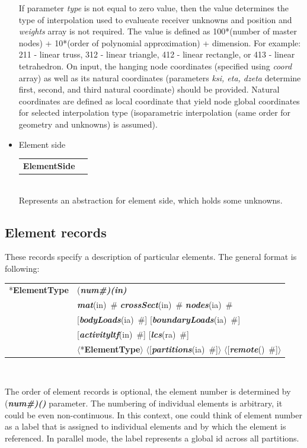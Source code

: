 \documentclass[a4paper]{article}
\makeatletter
\newcommand{\param}[1]{{\em #1}}
\newcommand{\fieldVal}[2]{\mbox{({\it\bf{#1}\#)\tiny (#2)}}}
\newcommand{\keywordnotype}[1]{\mbox{{\it{\bf{#1}}}}}
\newcommand{\keyword}[2]{\mbox{{\keywordnotype{#1}\tiny (#2)}}}
\newcommand{\entKeyword}[1]{\mbox{{*{\bf{#1}}}}}
\newcommand{\entKeywordInst}[1]{\mbox{{\bf{{#1}}}}}
\newcommand{\field}[2]{\mbox{\keyword{#1}{#2}~\#}}
\newcommand{\optField}[2]{\mbox{[\field{#1}{#2}]}}
\newcommand{\Pmode}[1]{{\sffamily #1}}
\newcommand{\PentKeyword}[1]{\mbox{{$\langle$*{\bf{#1}}$\rangle$}}}
\newcommand{\PoptField}[2]{\mbox{$\langle$[\field{#1}{#2}]$\rangle$}}
\newenvironment{record}[1][]{\begin{tabular}{|ll}}{\end{tabular}\\}
\newcommand{\recentry}[2]{{#1}&{#2}\\}
\newcounter{rcc}
\newenvironment{record}[1][\textwidth]{\setcounter{rcc}{0}\begin{tabular*}{#1}{|ll@{\extracolsep{\fill}}r}}{\end{tabular*}\\}
\newcommand{\recentry}[2]{\ifthenelse{\value{rcc}>0}{&$\backslash$ \\}{\setcounter{rcc}{1}}{#1}&{#2}}
\makeatother
\begin{document}
\begin{itemize}
If parameter \param{type} is not equal to zero value, then the value determines the type of interpolation used to
evalueate receiver unknowns and position and \param{weights} array is not required. The value is
defined as 100*(number of master nodes) + 10*(order of polynomial
approximation) + dimension. For example: 211 - linear truss, 312 -
linear triangle, 412 - linear rectangle, or 413 - linear tetrahedron.
On input, the hanging node coordinates (specified using
\param{coord} array) as well as its natural coordinates (parameters
\param{ksi, eta, dzeta} determine first, second, and third natural
coordinate) should be provided.  Natural coordinates are
defined as local coordinate that yield node global coordinates for
selected interpolation type (isoparametric interpolation (same order
for geometry and unknowns) is assumed).




\item Element side

  \begin{record}[0.9\textwidth]
    \recentry{\entKeywordInst{ElementSide}}{}
  \end{record}
  Represents an abstraction for element side, which holds some unknowns.
\end{itemize}

\subsection{Element records}
\label{_ElementsRecords}
These records specify a description of particular elements. The
general format is following:

\noindent
\begin{record}
  \recentry{\entKeyword{ElementType}}{\fieldVal{num}{in}}
  \recentry{}{\field{mat}{in} \field{crossSect}{in} \field{nodes}{ia}}
  \recentry{}{\optField{bodyLoads}{ia} \optField{boundaryLoads}{ia}}
  \recentry{}{\optField{activityltf}{in} \optField{lcs}{ra}}
  \recentry{}{\PentKeyword{ElementType} \PoptField{partitions}{ia} \PoptField{remote}{}}
\end{record}

The order of element records is optional, the element number is determined by \fieldVal{num}{} parameter.
The numbering of individual elements is arbitrary, it could be even non-continuous. In this context, one could think of element number as a label that is assigned to individual elements and by which the element is referenced.
\Pmode{In parallel mode, the label represents a global id across all partitions.}
\end{document}
